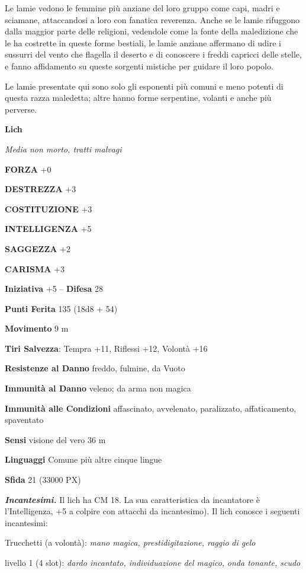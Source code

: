 \begin{multicols}{2}
Le lamie vedono le femmine più anziane del loro gruppo come capi, madri e sciamane, attaccandosi a loro con fanatica reverenza. Anche se le lamie rifuggono dalla maggior parte delle religioni, vedendole come la fonte della maledizione che le ha costrette in queste forme bestiali, le lamie anziane affermano di udire i sussurri del vento che flagella il deserto e di conoscere i freddi capricci delle stelle, e fanno affidamento su queste sorgenti mistiche per guidare il loro popolo.

Le lamie presentate qui sono solo gli esponenti più comuni e meno potenti di questa razza maledetta; altre hanno forme serpentine, volanti e anche più perverse.


\medskip{}\textbf{Lich}

\textit{Media non morto, tratti malvagi}

\textbf{FORZA} +0

\textbf{DESTREZZA} +3

\textbf{COSTITUZIONE} +3

\textbf{INTELLIGENZA} +5

\textbf{SAGGEZZA} +2

\textbf{CARISMA} +3

\textbf{Iniziativa} +5 -- \textbf{Difesa} 28

\textbf{Punti Ferita} 135 (18d8 + 54)

\textbf{Movimento} 9 m

\textbf{Tiri Salvezza}: Tempra +11, Riflessi +12, Volontà +16

\textbf{Resistenze al Danno} freddo, fulmine, da Vuoto

\textbf{Immunità al Danno} veleno; da arma non magica

\textbf{Immunità alle Condizioni} affascinato, avvelenato, paralizzato, affaticamento, spaventato

\textbf{Sensi} visione del vero 36 m

\textbf{Linguaggi} Comune più altre cinque lingue

\textbf{Sfida} 21 (33000 PX)

\textit{\textbf{Incantesimi.}} Il lich ha CM 18. La sua caratteristica da incantatore è l'Intelligenza, +5 a colpire con attacchi da incantesimo). Il lich conosce i seguenti incantesimi:

Trucchetti (a volontà): \textit{mano magica, prestidigitazione, raggio} \textit{di gelo}

livello 1 (4 slot): \textit{dardo incantato, individuazione del magico,} \textit{onda tonante, scudo}


\end{multicols}
